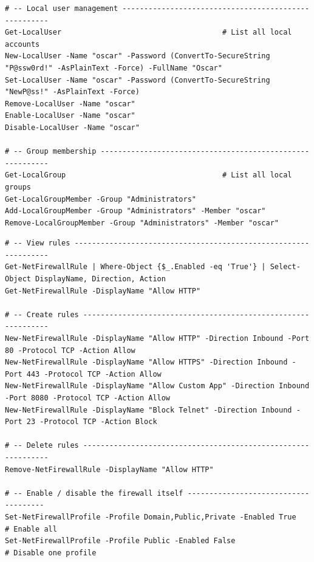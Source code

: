 \documentclass[11pt, letterpaper]{article}
\begin{document}
\begin{lstlisting}[style=shell, caption={User management in PowerShell}]
# -- Local user management -----------------------------------------------------
Get-LocalUser                                     # List all local accounts
New-LocalUser -Name "oscar" -Password (ConvertTo-SecureString "P@ssw0rd!" -AsPlainText -Force) -FullName "Oscar"
Set-LocalUser -Name "oscar" -Password (ConvertTo-SecureString "NewP@ss!" -AsPlainText -Force)
Remove-LocalUser -Name "oscar"
Enable-LocalUser -Name "oscar"
Disable-LocalUser -Name "oscar"

# -- Group membership ----------------------------------------------------------
Get-LocalGroup                                    # List all local groups
Get-LocalGroupMember -Group "Administrators"
Add-LocalGroupMember -Group "Administrators" -Member "oscar"
Remove-LocalGroupMember -Group "Administrators" -Member "oscar"
\end{lstlisting}

\begin{lstlisting}[style=shell, caption={Windows Defender Firewall via PowerShell}]
# -- View rules ----------------------------------------------------------------
Get-NetFirewallRule | Where-Object {$_.Enabled -eq 'True'} | Select-Object DisplayName, Direction, Action
Get-NetFirewallRule -DisplayName "Allow HTTP"

# -- Create rules --------------------------------------------------------------
New-NetFirewallRule -DisplayName "Allow HTTP" -Direction Inbound -Port 80 -Protocol TCP -Action Allow
New-NetFirewallRule -DisplayName "Allow HTTPS" -Direction Inbound -Port 443 -Protocol TCP -Action Allow
New-NetFirewallRule -DisplayName "Allow Custom App" -Direction Inbound -Port 8080 -Protocol TCP -Action Allow
New-NetFirewallRule -DisplayName "Block Telnet" -Direction Inbound -Port 23 -Protocol TCP -Action Block

# -- Delete rules --------------------------------------------------------------
Remove-NetFirewallRule -DisplayName "Allow HTTP"

# -- Enable / disable the firewall itself -------------------------------------
Set-NetFirewallProfile -Profile Domain,Public,Private -Enabled True   # Enable all
Set-NetFirewallProfile -Profile Public -Enabled False                 # Disable one profile
\end{lstlisting}
\end{document}
